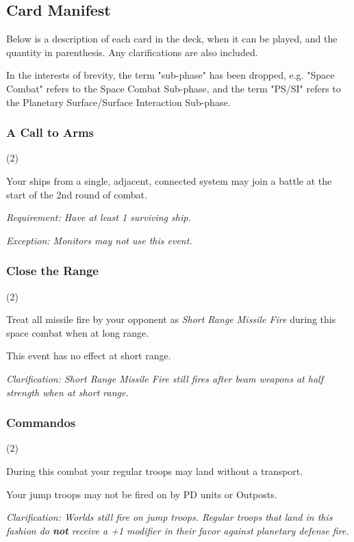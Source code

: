 \subsection{Card Manifest}

Below is a description of each card in the deck, when it can be played, and the quantity in parenthesis. Any clarifications are also included.

In the interests of brevity, the term "sub-phase" has been dropped, e.g. "Space Combat" refers to the Space Combat Sub-phase, and the term "PS/SI" refers to the Planetary Surface/Surface Interaction Sub-phase.

\subsubsection{A Call to Arms} (2)


Your ships from a single, adjacent, connected system may join a battle at the start of the 2nd round of combat.

\textit{Requirement: Have at least 1 surviving ship.}

\textit{Exception: Monitors may not use this event.}

\subsubsection{Close the Range} (2)


Treat all missile fire by your opponent as \textit{Short Range Missile Fire} during this space combat when at long range.

This event has no effect at short range.

\textit{Clarification: Short Range Missile Fire still fires after beam weapons at half strength when at short range.}

\subsubsection{Commandos} (2)


During this combat your regular troops may land without a transport.

Your jump troops may not be fired on by PD units or Outposts.

\textit{Clarification: Worlds still fire on jump troops. Regular troops that land in this fashion do \textbf{not} receive a +1 modifier in their favor against planetary defense fire.}

